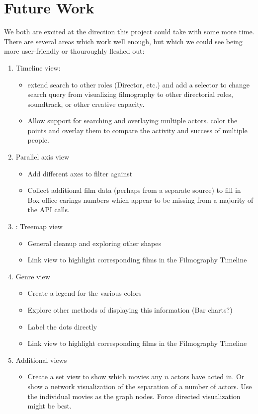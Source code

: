\documentclass[12pt]{article}
\begin{document}
\newpage

\section{Future Work}


We both are excited at the direction this project could take with some more time.  There are several areas which work well enough, but which we could see being more user-friendly or thouroughly fleshed out:


\begin{enumerate}

	\item Timeline view:
		\begin{itemize}
			\item extend search to other roles (Director, etc.) and add a selector to change search query from visualizing filmography to other directorial roles, soundtrack, or other creative capacity.  
			\item Allow support for searching and overlaying multiple actors. color the points and overlay them to compare the activity and success of multiple people.
		\end{itemize}
		
	\item Parallel axis view
		\begin{itemize}
			\item Add different axes to filter against
			\item Collect additional film data (perhaps from a separate source) to fill in Box office earings numbers which appear to be missing from a majority of the API calls.
		\end{itemize}
	
	\item: Treemap view
		\begin{itemize}
			\item General cleanup  and exploring other shapes
			\item Link view to highlight corresponding films in the Filmography Timeline
		\end{itemize}

	\item Genre view
		\begin{itemize}
			\item Create a legend for the various colors
			\item Explore other methods of displaying this information (Bar charts?)
			\item Label the dots directly
			\item Link view to highlight corresponding films in the Filmography Timeline
		\end{itemize}
	\item Additional views
		\begin{itemize}
			\item Create a set view to show which movies any $n$ actors have acted in.  Or show a network visualization of the separation of a number of actors.  Use the individual movies as the graph nodes.  Force directed visualization might be best.
		\end{itemize}
\end{enumerate}
\end{document}
